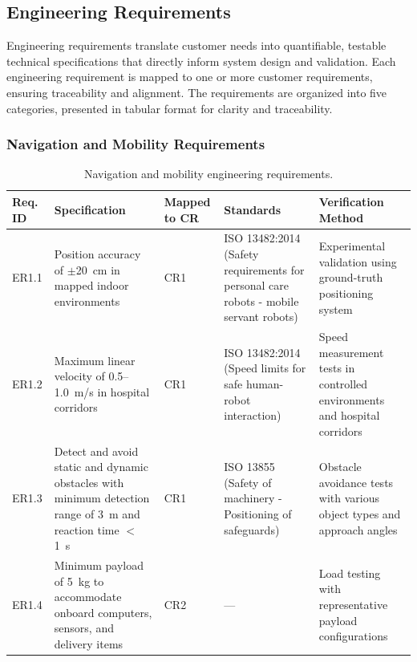 \subsection{Engineering Requirements}

Engineering requirements translate customer needs into quantifiable, testable technical specifications that directly inform system design and validation. Each engineering requirement is mapped to one or more customer requirements, ensuring traceability and alignment. The requirements are organized into five categories, presented in tabular format for clarity and traceability.

\subsubsection{Navigation and Mobility Requirements}

\begin{table}[H]
\centering
\small
\begin{tabularx}{\linewidth}{|l|>{\raggedright\arraybackslash}X|l|>{\raggedright\arraybackslash}X|>{\raggedright\arraybackslash}X|}
\hline
\textbf{Req. ID} & \textbf{Specification} & \textbf{Mapped to CR} & \textbf{Standards} & \textbf{Verification Method} \\
\hline
ER1.1 & Position accuracy of $\pm$20~cm in mapped indoor environments & CR1 & ISO 13482:2014 \cite{iso13482:2014} (Safety requirements for personal care robots - mobile servant robots) & Experimental validation using ground-truth positioning system \\
\hline
ER1.2 & Maximum linear velocity of 0.5--1.0~m/s in hospital corridors & CR1 & ISO 13482:2014 \cite{iso13482:2014} (Speed limits for safe human-robot interaction) & Speed measurement tests in controlled environments and hospital corridors \\
\hline
ER1.3 & Detect and avoid static and dynamic obstacles with minimum detection range of 3~m and reaction time $<$1~s & CR1 & ISO 13855 \cite{iso13855} (Safety of machinery - Positioning of safeguards) & Obstacle avoidance tests with various object types and approach angles \\
\hline
ER1.4 & Minimum payload of 5~kg to accommodate onboard computers, sensors, and delivery items & CR2 & --- & Load testing with representative payload configurations \\
\hline
\end{tabularx}
\caption{Navigation and mobility engineering requirements.}
\label{tab:er_navigation}
\end{table}

